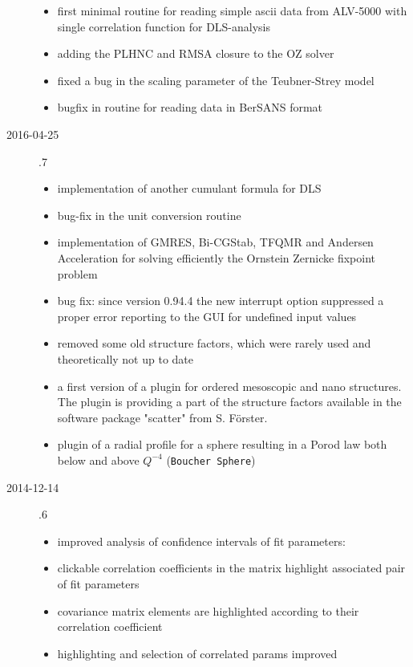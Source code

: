 \begin{description}
\begin{itemize}
        \item first minimal routine for reading simple ascii data from ALV-5000 with single correlation function for DLS-analysis
        \item adding the PLHNC and RMSA closure to the OZ solver
        \item fixed a bug in the scaling parameter of the Teubner-Strey model
        \item bugfix in routine for reading data in BerSANS format
    \end{itemize}
\item[2016-04-25] .7
    \begin{itemize}
        \item  implementation of another cumulant formula for DLS
        \item  bug-fix in the unit conversion routine
        \item  implementation of GMRES, Bi-CGStab, TFQMR and Andersen Acceleration
                for solving efficiently the Ornstein Zernicke fixpoint problem
        \item   bug fix: since version 0.94.4 the new interrupt option suppressed
                a proper error reporting to the GUI for undefined input values
        \item   removed some old structure factors,
                which were rarely used and theoretically not up to date
        \item   a first version of a plugin for ordered mesoscopic and nano structures.
                The plugin is providing a part of the structure factors available
                in the software package "scatter" from S. Förster.
        \item   plugin of a radial profile for a sphere resulting in a Porod law both below and above $Q^{-4}$ (\texttt{Boucher Sphere})
    \end{itemize}
\item[2014-12-14] .6
    \begin{itemize}
        \item improved analysis of confidence intervals of fit parameters:
        \item clickable correlation coefficients in the matrix highlight associated
             pair of fit parameters
        \item covariance matrix elements are highlighted according to their correlation
            coefficient
        \item highlighting and selection of correlated params improved

\end{itemize}
\end{description}
